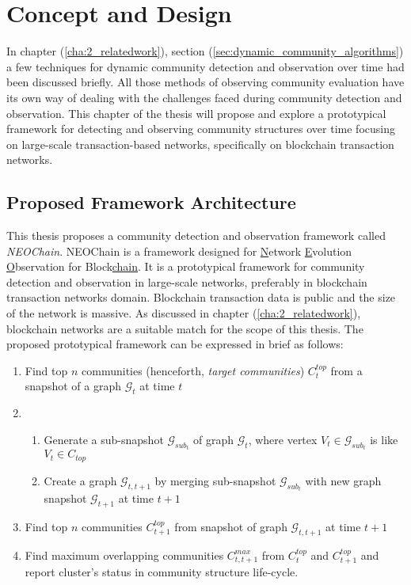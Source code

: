 \chapter{Concept and Design}\label{cha:3_concept_and_design}
In chapter (\ref{cha:2_relatedwork}), section (\ref{sec:dynamic_community_algorithms}) a few techniques for dynamic community detection and observation over time had been discussed briefly. All those methods of observing community evaluation have its own way of dealing with the challenges faced during community detection and observation. This chapter of the thesis will propose and explore a prototypical framework for detecting and observing community structures over time focusing on large-scale transaction-based networks, specifically on blockchain transaction networks.

\section{Proposed Framework Architecture}\label{sec:framework}
This thesis proposes a community detection and observation framework called \textit{NEOChain}. NEOChain is a framework designed for \underline{N}etwork \underline{E}volution \underline{O}bservation for Block\underline{chain}. It is a prototypical framework for community detection and observation in large-scale networks, preferably in blockchain transaction networks domain. Blockchain transaction data is public and the size of the network is massive. As discussed in chapter (\ref{cha:2_relatedwork}), blockchain networks are a suitable match for the scope of this thesis. The proposed prototypical framework can be expressed in brief as follows:

\begin{enumerate}[label=(\roman*)]
\item Find top $n$ communities (henceforth, \textit{target communities}) $C_t^{top}$ from a snapshot of a graph $\mathcal{G}_t$ at time $t$
\item
\begin{enumerate}
	\item Generate a sub-snapshot $\mathcal{G}_{sub_{t}}$ of graph $\mathcal{G}_t$, where vertex $V_t 		\in \mathcal{G}_{sub_{t}}$ is like $V_t \in C_{top}$ 
	\item Create a graph $\mathcal{G}_{t, t+1}$ by merging sub-snapshot $\mathcal{G}_{sub_{t}}$ with 		new graph snapshot $\mathcal{G}_{t+1}$ at time $t+1$
\end{enumerate}
\item Find top $n$ communities $C_{t+1}^{top}$ from snapshot of graph $\mathcal{G}_{t, t+1}$ at time $t+1$
\item Find maximum overlapping communities $C_{t, t+1}^{max}$ from $C_t^{top}$ and $C_{t+1}^{top}$ and report cluster's status in community structure life-cycle.
\end{enumerate}

